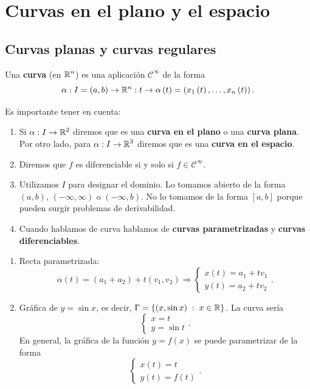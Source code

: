 \chapter{Curvas en el plano y el espacio}
\section{Curvas planas y curvas regulares}
\begin{definition}[Curva]
Una \textbf{curva} (en $\displaystyle \mathbb{R}^{n} $) es una aplicación $\displaystyle \mathcal{C}^{\infty } $ de la forma  
\[ \alpha : I = \left(a,b\right)\to \mathbb{R}^{n} : t \to \alpha\left(t\right)=\left(x_{1}\left(t\right), \ldots, x_{n}\left(t\right)\right).\]
\end{definition}
\begin{notation}
	Es importante tener en cuenta:
	\begin{enumerate}
	\item Si $\displaystyle \alpha : I \to \mathbb{R}^{2} $ diremos que es una \textbf{curva en el plano} o una \textbf{curva plana}. Por otro lado, para $\displaystyle \alpha : I \to \mathbb{R}^{3} $ diremos que es una \textbf{curva en el espacio}.
	\item Diremos que $\displaystyle f $ es diferenciable si y solo si $\displaystyle f \in \mathcal{C}^{\infty } $.
	\item Utilizamos $\displaystyle I $ para designar el dominio. Lo tomamos abierto de la forma $\displaystyle \left(a,b\right) $, $\displaystyle \left(-\infty, \infty\right) $ o $\displaystyle \left(-\infty, b\right) $. No lo tomamos de la forma $\displaystyle \left[a,b\right]  $ porque pueden surgir problemas de derivabilidad.
	\item Cuando hablamos de curva hablamos de \textbf{curvas parametrizadas} y \textbf{curvas diferenciables}.
	\end{enumerate}
\end{notation}
\begin{eg}
\begin{enumerate}
\item Recta parametrizada:
	\[\alpha\left(t\right)=\left(a_{1}+a_{2}\right) + t\left(v_{1}, v_{2}\right) \Rightarrow 
	\begin{cases}
	x\left(t\right)= a_{1} + tv_{1} \\
	y\left(t\right)= a_{2} + tv_{2}
	\end{cases}
	.\]
\item Gráfica de $\displaystyle y = \sin x $, es decir, $\displaystyle \Gamma = \left\{ \left(x, \sin x\right) \; : \; x \in \mathbb{R}\right\}  $. La curva sería
	\[
	\begin{cases}
	x = t \\
	y = \sin t
	\end{cases}
	.\]
En general, la gráfica de la función $\displaystyle y = f\left(x\right) $ se puede parametrizar de la forma
\[
\begin{cases}
x\left(t\right)=t \\
y\left(t\right)=f\left(t\right)
\end{cases}
.\]
\end{enumerate}

\end{eg}
